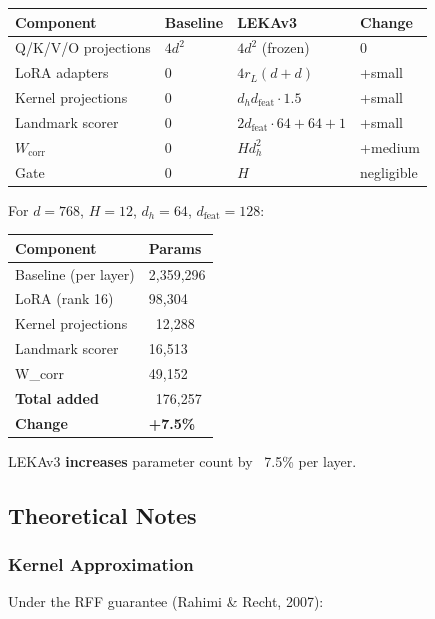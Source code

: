 \begin{table}[H]
\centering
\small
\begin{tabular}{llll}
\toprule
\textbf{Component} & \textbf{Baseline} & \textbf{LEKAv3} & \textbf{Change} \\
\midrule
Q/K/V/O projections & $4 d^2$ & $4 d^2$ (frozen) & 0 \\
LoRA adapters & 0 & $4 r_L (d + d)$ & +small \\
Kernel projections & 0 & $d_h d_\text{feat} \cdot 1.5$ & +small \\
Landmark scorer & 0 & $2 d_\text{feat} \cdot 64 + 64 + 1$ & +small \\
$W_\text{corr}$ & 0 & $H d_h^2$ & +medium \\
Gate & 0 & $H$ & negligible \\
\bottomrule
\end{tabular}
\end{table}

For $d = 768$, $H = 12$, $d_h = 64$, $d_\text{feat} = 128$:

\begin{table}[H]
\centering
\small
\begin{tabular}{ll}
\toprule
\textbf{Component} & \textbf{Params} \\
\midrule
Baseline (per layer) & 2,359,296 \\
LoRA (rank 16) & 98,304 \\
Kernel projections & ~12,288 \\
Landmark scorer & 16,513 \\
W\_corr & 49,152 \\
\textbf{Total added} & ~176,257 \\
\textbf{Change} & \textbf{+7.5\%} \\
\bottomrule
\end{tabular}
\end{table}

LEKAv3 \textbf{increases} parameter count by ~7.5\% per layer.

\subsection{Theoretical Notes}

\subsubsection{Kernel Approximation}

Under the RFF guarantee (Rahimi \& Recht, 2007):

